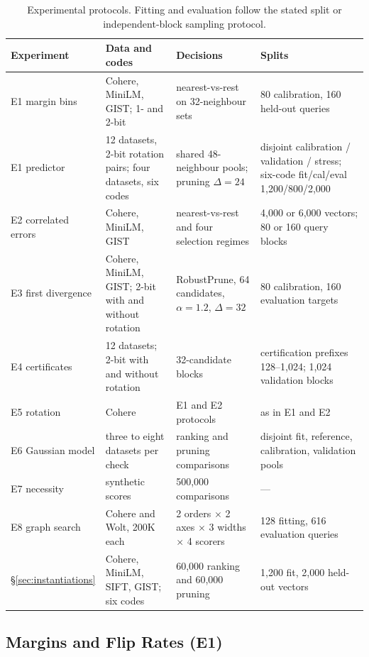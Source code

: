 \documentclass[twoside,11pt]{article}
\begin{document}
\begin{table}[tbp]
\centering


\small
\setlength{\tabcolsep}{3pt}
\begin{tabular}{L{2.6cm}L{3.3cm}L{4.3cm}L{3.6cm}}
\toprule
Experiment & Data and codes & Decisions & Splits \\
\midrule
E1 margin bins & Cohere, MiniLM, GIST; 1- and 2-bit & nearest-vs-rest on 32-neighbour sets & 80 calibration, 160 held-out queries \\
E1 predictor & 12 datasets, 2-bit rotation pairs; four datasets, six codes & shared 48-neighbour pools; pruning $\Delta=24$ & disjoint calibration / validation / stress; six-code fit/cal/eval 1{,}200/800/2{,}000 \\
E2 correlated errors & Cohere, MiniLM, GIST & nearest-vs-rest and four selection regimes & 4{,}000 or 6{,}000 vectors; 80 or 160 query blocks \\
E3 first divergence & Cohere, MiniLM, GIST; 2-bit with and without rotation & RobustPrune, 64 candidates, $\alpha=1.2$, $\Delta=32$ & 80 calibration, 160 evaluation targets \\
E4 certificates & 12 datasets; 2-bit with and without rotation & 32-candidate blocks & certification prefixes 128--1{,}024; 1{,}024 validation blocks \\
E5 rotation & Cohere & E1 and E2 protocols & as in E1 and E2 \\
E6 Gaussian model & three to eight datasets per check & ranking and pruning comparisons & disjoint fit, reference, calibration, validation pools \\
E7 necessity & synthetic scores & 500{,}000 comparisons & --- \\
E8 graph search & Cohere and Wolt, 200K each & 2 orders $\times$ 2 axes $\times$ 3 widths $\times$ 4 scorers & 128 fitting, 616 evaluation queries \\
\S\ref{sec:instantiations} & Cohere, MiniLM, SIFT, GIST; six codes & 60{,}000 ranking and 60{,}000 pruning & 1{,}200 fit, 2{,}000 held-out vectors \\
\bottomrule
\end{tabular}

\small
\caption{Experimental protocols. Fitting and evaluation follow the stated split or independent-block sampling protocol.}
\label{tab:protocols}
\end{table}

\subsection{Margins and Flip Rates (E1)}
\label{sec:exp-margins}
\end{document}
